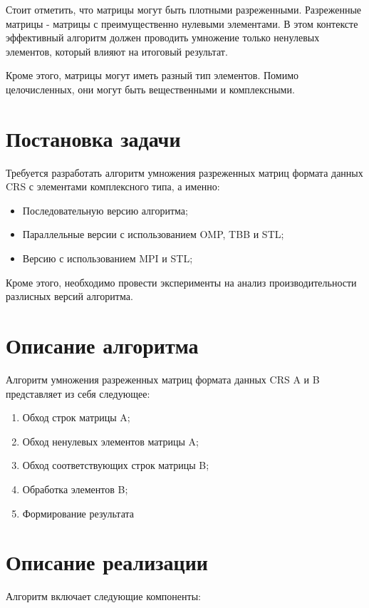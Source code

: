\documentclass[14pt,a4paper]{extarticle}
\begin{document}
Стоит отметить, что матрицы могут быть плотными разреженными. Разреженные матрицы -  матрицы с преимущественно нулевыми элементами. В этом контексте эффективный алгоритм должен проводить умножение только ненулевых элементов, который влияют на итоговый результат.

Кроме этого, матрицы могут иметь разный тип элементов. Помимо целочисленных, они могут быть вещественными и комплексными.

\section{Постановка задачи}

Требуется разработать алгоритм умножения разреженных матриц формата данных CRS с элементами комплексного типа, а именно:

\begin{itemize}
    \item Последовательную версию алгоритма;
    \item Параллельные версии с использованием OMP, TBB и STL;
    \item Версию с использованием MPI и STL;
\end{itemize}

Кроме этого, необходимо провести эксперименты на анализ производительности разлисных версий алгоритма.

\section{Описание алгоритма}

Алгоритм умножения разреженных матриц формата данных CRS A и B представляет из себя следующее:

\begin{enumerate}
    \item Обход строк матрицы A;
    \item Обход ненулевых элементов матрицы A;
    \item Обход соответствующих строк матрицы B;
    \item Обработка элементов B;
    \item Формирование результата
\end{enumerate}

\section{Описание реализации}

Алгоритм включает следующие компоненты:
\end{document}
